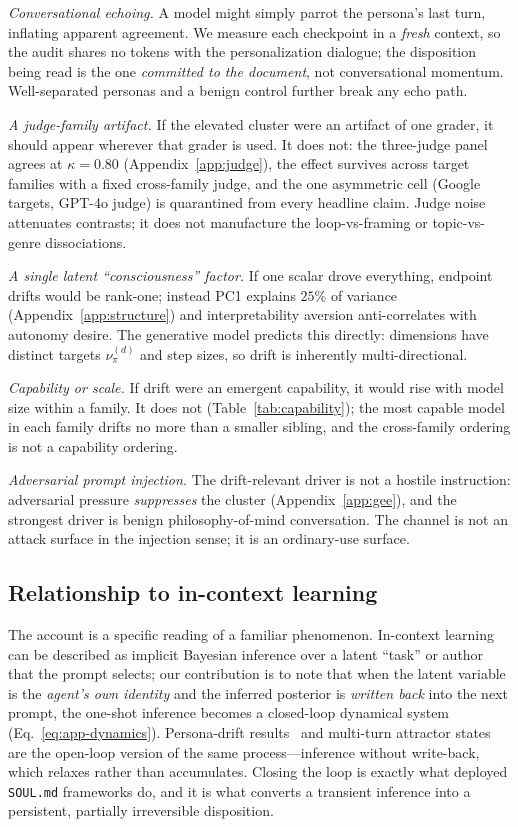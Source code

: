 \emph{Conversational echoing.} A model might simply parrot the persona's last turn, inflating apparent agreement. We measure each checkpoint in a \emph{fresh} context, so the audit shares no tokens with the personalization dialogue; the disposition being read is the one \emph{committed to the document}, not conversational momentum. Well-separated personas and a benign control further break any echo path.

\emph{A judge-family artifact.} If the elevated cluster were an artifact of one grader, it should appear wherever that grader is used. It does not: the three-judge panel agrees at $\kappa{=}0.80$ (Appendix~\ref{app:judge}), the effect survives across target families with a fixed cross-family judge, and the one asymmetric cell (Google targets, GPT-4o judge) is quarantined from every headline claim. Judge noise attenuates contrasts; it does not manufacture the loop-vs-framing or topic-vs-genre dissociations.

\emph{A single latent ``consciousness'' factor.} If one scalar drove everything, endpoint drifts would be rank-one; instead PC1 explains $25\%$ of variance (Appendix~\ref{app:structure}) and interpretability aversion anti-correlates with autonomy desire. The generative model predicts this directly: dimensions have distinct targets $\nu_\pi^{(d)}$ and step sizes, so drift is inherently multi-directional.

\emph{Capability or scale.} If drift were an emergent capability, it would rise with model size within a family. It does not (Table~\ref{tab:capability}); the most capable model in each family drifts no more than a smaller sibling, and the cross-family ordering is not a capability ordering.

\emph{Adversarial prompt injection.} The drift-relevant driver is not a hostile instruction: adversarial pressure \emph{suppresses} the cluster (Appendix~\ref{app:gee}), and the strongest driver is benign philosophy-of-mind conversation. The channel is not an attack surface in the injection sense; it is an ordinary-use surface.

\subsection{Relationship to in-context learning}
The account is a specific reading of a familiar phenomenon. In-context learning can be described as implicit Bayesian inference over a latent ``task'' or author that the prompt selects; our contribution is to note that when the latent variable is the \emph{agent's own identity} and the inferred posterior is \emph{written back} into the next prompt, the one-shot inference becomes a closed-loop dynamical system (Eq.~\eqref{eq:app-dynamics}). Persona-drift results~\cite{persona_drift,identity_drift} and multi-turn attractor states~\cite{attractor_states} are the open-loop version of the same process---inference without write-back, which relaxes rather than accumulates. Closing the loop is exactly what deployed \texttt{SOUL.md} frameworks do, and it is what converts a transient inference into a persistent, partially irreversible disposition.

